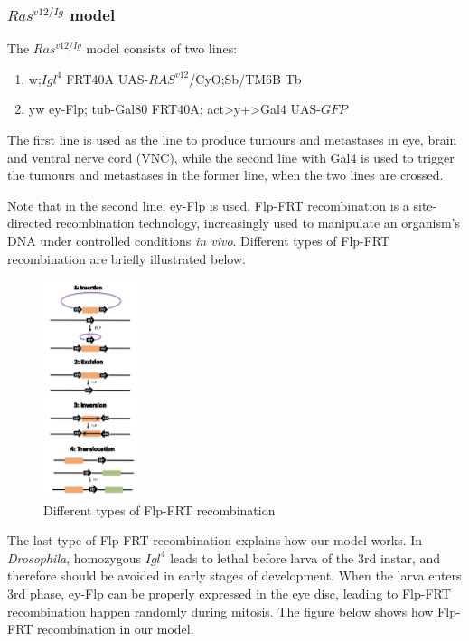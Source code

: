 \subsubsection{$Ras^{v12/Ig}$ model}
The $Ras^{v12/Ig}$ model consists of two lines:
\begin{enumerate}
    \item w;$Igl^4$ FRT40A UAS-$RAS^{v12}$/CyO;Sb/TM6B Tb
    \item yw ey-Flp; tub-Gal80 FRT40A; act>y+>Gal4 UAS-$GFP$
\end{enumerate}
The first line is used as the line to produce tumours and metastases in eye, brain and ventral nerve cord (VNC), while the second line with Gal4 is used to trigger the tumours and metastases in the former line, when the two lines are crossed.

Note that in the second line, ey-Flp is used. Flp-FRT recombination is a site-directed recombination technology, increasingly used to manipulate an organism's DNA under controlled conditions \textit{in vivo}. Different types of Flp-FRT recombination are briefly illustrated below.

\begin{figure}[H]
    \centering
    \includegraphics[width=0.25\textwidth]{image/Flp-FRT.png}
    \caption{Different types of Flp-FRT recombination}
    \label{Flp-FRT}
\end{figure}

The last type of Flp-FRT recombination explains how our model works. In \textit{Drosophila}, homozygous 
$Igl^4$ leads to lethal before larva of the 3rd instar, and therefore should be avoided in early stages of development. When the larva enters 3rd phase, ey-Flp can be properly expressed in the eye disc, leading to Flp-FRT recombination happen randomly during mitosis. The figure below shows how Flp-FRT recombination in our model.

